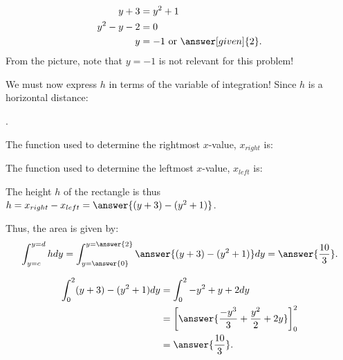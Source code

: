 \documentclass{ximera}
\begin{document}
\begin{exercise}
\begin{exercise}
\begin{exercise}
\begin{exercise}
\begin{hint}
   \begin{align*}
    y+3 &= y^2 +1\\
  y^2-y-2 &= 0\\
    y &= -1 \text{ or }\answer[given]{2}.
  \end{align*}
  From the picture, note that $y=-1$ is not relevant for this problem!
\end{hint}

We must now express $h$ in terms of the variable of integration!  Since $h$ is a horizontal distance: 

\begin{multipleChoice}
.
\end{multipleChoice}

\begin{exercise}

The function used to determine the rightmost $x$-value, $x_{right}$ is:
\begin{multipleChoice}
\end{multipleChoice}

The function used to determine  the leftmost $x$-value, $x_{left}$ is:
\begin{multipleChoice}
\end{multipleChoice}

The height $h$ of the rectangle is thus $h=x_{right}-x_{left} = \answer{(y+3)-(y^2+1)}$.


\begin{exercise}

Thus, the area is given by:
  \[
 \int_{y=c}^{y=d} h dy =  \int_{y=\answer{0}}^{y=\answer{2}} \answer{(y+3) - (y^2+1)} dy = \answer{\frac{10}{3}}.
  \]
  \begin{hint}
    \begin{align*}
      \int_0^2 (y+3) - (y^2+1) dy &= \int_0^2 -y^2+y+2 dy\\
      &=\bigg[\answer{\frac{-y^3}{3} + \frac{y^2}{2}+2y}\bigg]_0^2\\
      &=\answer{\frac{10}{3}}.
    \end{align*}
  \end{hint}

\end{exercise}
\end{exercise}
\end{exercise}
\end{exercise}
\end{exercise}
\end{exercise}
\end{document}
